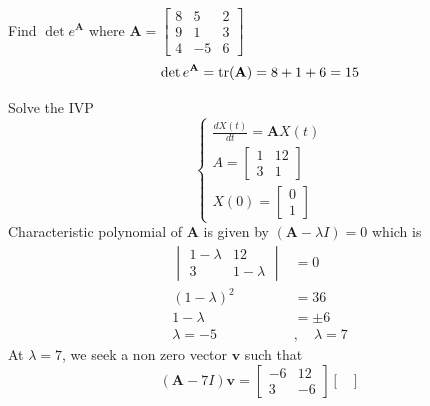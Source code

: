 \begin{example}
    Find $\det e^{\mathbf{A}}$ where
    \(
    \mathbf{A} = \begin{bmatrix}
        8 & 5  & 2 \\
        9 & 1  & 3 \\
        4 & -5 & 6
    \end{bmatrix}
    \)
    \[
        \det e^{\mathbf{A}} = \trace(\mathbf{A}) = 8+1+6 = 15
    \]
\end{example}
\newpage
\begin{example}
    Solve the IVP
    \begin{equation}
        \begin{cases}
            \displaystyle \frac{dX(t)}{dt} = \mathbf{A}X(t)
            \\
            A =
            \begin{bmatrix}
                1 & 12 \\
                3 & 1
            \end{bmatrix}
            \\
            X(0) =
            \begin{bmatrix}
                0 \\
                1
            \end{bmatrix}
        \end{cases}
    \end{equation}
    Characteristic polynomial of $\mathbf{A}$ is given by $(\mathbf{A}-\lambda I) = 0$ which is
    \begin{align*}
        \begin{vmatrix}
            1-\lambda & 12        \\
            3         & 1-\lambda
        \end{vmatrix} & = 0
        \\
        (1-\lambda)^2            & = 36
        \\
        1-\lambda                & = \pm 6
        \\
        \lambda = -5 \quad       & , \quad \lambda = 7
    \end{align*}
    At $\lambda = 7$, we seek a non zero vector $\mathbf{v}$ such that
    \[
        (\mathbf{A} - 7 I) \mathbf{v} =
        \begin{bmatrix}
            -6 & 12 \\
            3  & -6
        \end{bmatrix}
        \begin{bmatrix}

\end{bmatrix}\]
\end{example}
